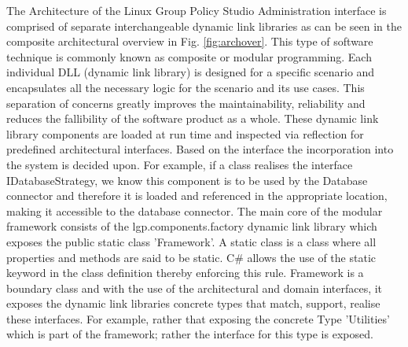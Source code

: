		\vspace{-5mm}
		\begin{multicols}{2}
		
			The Architecture of the Linux Group Policy Studio Administration interface is comprised of separate interchangeable dynamic link libraries 
			as can be seen in the composite architectural overview in Fig. \ref{fig:archover}.  			
			This type of software technique is commonly known as composite or modular programming.  
			\newline
			\newline
			Each individual DLL (dynamic link library) is designed 
			for a specific scenario and encapsulates all the necessary logic for the scenario and its use cases.   
			This separation of concerns greatly improves the maintainability, reliability and reduces the fallibility of the software product as a whole.
			\newline
			\newline
			These dynamic link library components are loaded at run time and inspected via reflection for predefined architectural 
			interfaces.  Based on the interface the incorporation into the system is decided upon.  
			For example, if a class realises the interface IDatabaseStrategy,  we know this component is to be used by the Database connector 
			and therefore it is loaded and referenced in the appropriate location, making it accessible to the database connector.
			\newline
			\newline
			The main core of the modular framework consists of the lgp.components.factory dynamic link library which exposes the public static class 'Framework'.
			A static class is a class where all properties and methods are said to be static. C\# allows the use of the static keyword in the class definition
			thereby enforcing this rule. 
			\newline
			\newline
			Framework is a boundary class and with the use of the architectural and domain interfaces, it exposes the 
			dynamic link libraries concrete types that match, support, realise these interfaces.
			For example, rather that exposing the concrete Type 'Utilities' which is part of the framework;
			rather the interface for this type is exposed.  
		
			\columnbreak
		

\end{multicols}

